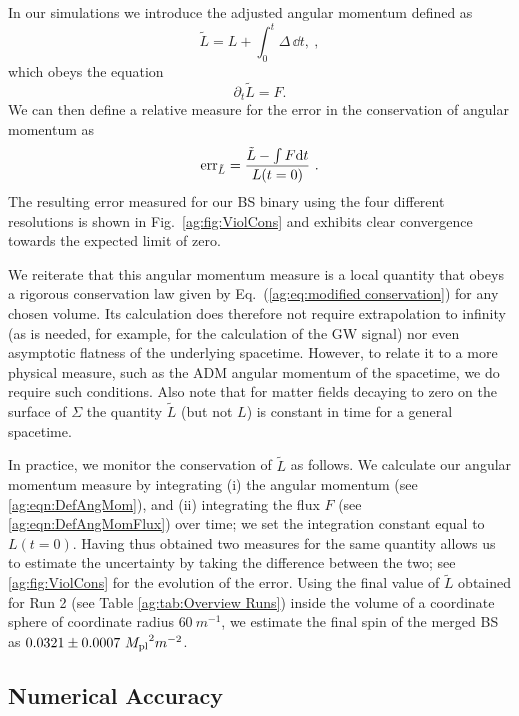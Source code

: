 In our simulations we introduce the adjusted angular momentum
defined as
\begin{equation}
 \tilde{L} = {L}+\int_{0}^t {\Delta} \,\dd t, \label{ag:eqn:DefAngMom}~,
\end{equation}
which obeys the equation
\begin{equation}
\label{ag:eq:modified conservation}\partial_t\tilde{L} = {F}.
\end{equation}
We can then define a relative measure for the error in the
conservation of angular momentum as
\begin{equation}
    {\rm err }_{\tilde{L}} = \frac{\tilde{L} - \int F {\rm d}t}{{L}(t=0)}~.\label{ag:eqn:ang_mom}
\end{equation}
The resulting error measured for our BS binary using the
four different resolutions is shown in Fig.~\ref{ag:fig:ViolCons}
and exhibits clear convergence towards the expected limit of
zero.

We reiterate that this angular momentum measure is a
local quantity that obeys a rigorous conservation law
given by Eq.~(\ref{ag:eq:modified conservation}) for
any chosen volume.
Its calculation does therefore not require extrapolation
to infinity (as is needed, for example, for the calculation
of the GW signal) nor even asymptotic flatness of the underlying spacetime.
However, to relate it to a more physical measure, such as the ADM angular momentum of the spacetime, we do require such conditions.
Also note that for matter fields decaying to zero on the surface of $\Sigma$ the quantity $\tilde{L}$ (but not $L$) is constant in time for a general spacetime.

In practice, we monitor the conservation of $\tilde{L}$ as follows.
We calculate our angular momentum measure by integrating (i) the angular momentum (see \ref{ag:eqn:DefAngMom}), and (ii) integrating the flux $F$ (see \ref{ag:eqn:DefAngMomFlux}) over time; we set the integration constant equal to ${L}(t=0)$. Having thus obtained two measures for the same quantity allows us to estimate the uncertainty by taking the difference between the two; see \ref{ag:fig:ViolCons} for the evolution of the error.
Using the final value of $\tilde{L}$ obtained for Run 2
(see Table \ref{ag:tab:Overview Runs}) inside the volume of
a coordinate sphere of coordinate radius $60~m^{-1}$, we estimate the final spin
of the merged BS as $0.0321 \pm 0.0007~{M_{\rm pl}}^2 m^{-2}$.

\subsection{Numerical Accuracy}
\label{ag:sec:numacc}

